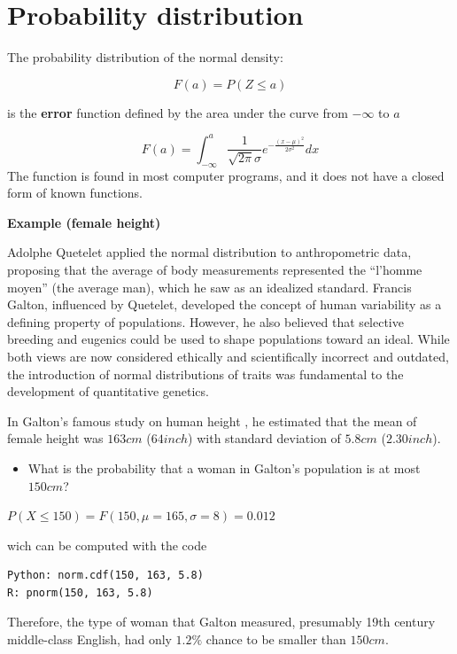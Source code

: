 \documentclass[
]{book}
\providecommand{\tightlist}{%
  \setlength{\itemsep}{0pt}\setlength{\parskip}{0pt}}
\begin{document}
\hypertarget{probability-distribution-2}{%
\section{Probability distribution}\label{probability-distribution-2}}

The probability distribution of the normal density:

\[F(a)=P(Z \leq a)\]

is the \textbf{error} function defined by the area under the curve from \(-\infty\) to \(a\)

\[F(a)=\int_{-\infty}^{a}\frac{1}{\sqrt{2\pi}\sigma}e^{-\frac{(x-\mu)^2}{2\sigma^2}} dx\]
The function is found in most computer programs, and it does not have a closed form of known functions.

\textbf{Example (female height)}

Adolphe Quetelet applied the normal distribution to anthropometric data, proposing that the average of body measurements represented the ``l'homme moyen'' (the average man), which he saw as an idealized standard. Francis Galton, influenced by Quetelet, developed the concept of human variability as a defining property of populations. However, he also believed that selective breeding and eugenics could be used to shape populations toward an ideal. While both views are now considered ethically and scientifically incorrect and outdated, the introduction of normal distributions of traits was fundamental to the development of quantitative genetics.

In Galton's famous study on human height \citep{Galton1886}, he estimated that the mean of female height was \(163cm\) (\(64inch\)) with standard deviation of \(5.8cm\) (\(2.30inch\)).

\begin{itemize}
\tightlist
\item
  What is the probability that a woman in Galton's population is at most \(150cm\)?
\end{itemize}

\(P(X\le 150)=F(150, \mu=165, \sigma=8)=0.012\)

wich can be computed with the code

\begin{verbatim}
Python: norm.cdf(150, 163, 5.8)
R: pnorm(150, 163, 5.8)
\end{verbatim}

Therefore, the type of woman that Galton measured, presumably 19th century middle-class English, had only \(1.2\%\) chance to be smaller than \(150cm\).
\end{document}

